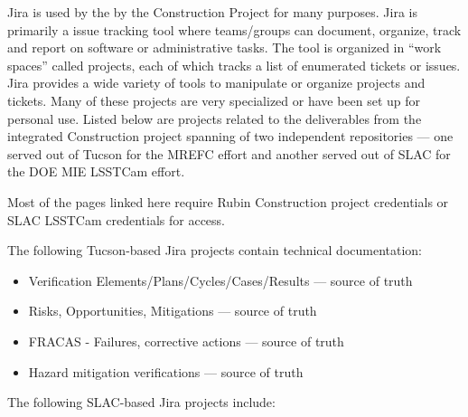 Jira is used by the by the Construction Project for many purposes.
Jira is primarily a issue tracking tool where teams/groups can document, organize, track and report on software or administrative tasks. \citep{Jira-cite}
The tool is organized in ``work spaces'' called projects, each of which tracks a list of enumerated tickets or issues.
Jira provides a wide variety of tools to manipulate or organize projects and tickets.
Many of these projects are very specialized or have been set up for personal use.
Listed below are projects related to the deliverables from the integrated Construction project spanning of two independent repositories --- one served out of Tucson for the MREFC effort and another served out of SLAC for the DOE MIE LSSTCam effort.

Most of the pages linked here require Rubin Construction project credentials or SLAC LSSTCam credentials for access.

The following Tucson-based Jira projects contain technical documentation:

\begin{itemize}
	\item Verification Elements/Plans/Cycles/Cases/Results --- source of truth
	\item Risks, Opportunities, Mitigations --- source of truth
	\item FRACAS - Failures, corrective actions --- source of truth
	\item Hazard mitigation verifications --- source of truth
\end{itemize}

The following SLAC-based Jira projects include:

